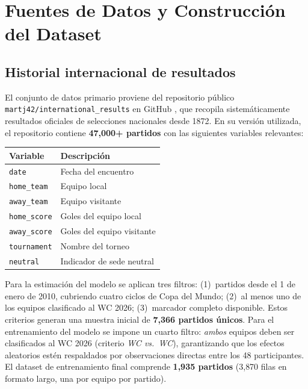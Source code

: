 \documentclass[12pt,a4paper]{article}
\begin{document}
\section{Fuentes de Datos y Construcción del Dataset}
\label{sec:data}

\subsection{Historial internacional de resultados}

El conjunto de datos primario proviene del repositorio público
\texttt{martj42/international\_results} en GitHub \citep{martj42},
que recopila sistemáticamente resultados oficiales de selecciones nacionales
desde 1872. En su versión utilizada, el repositorio contiene
\textbf{47{,}000+ partidos} con las siguientes variables relevantes:

\begin{center}
\begin{tabular}{ll}
\toprule
\textbf{Variable}   & \textbf{Descripción} \\
\midrule
\texttt{date}       & Fecha del encuentro \\
\texttt{home\_team} & Equipo local \\
\texttt{away\_team} & Equipo visitante \\
\texttt{home\_score}& Goles del equipo local \\
\texttt{away\_score}& Goles del equipo visitante \\
\texttt{tournament} & Nombre del torneo \\
\texttt{neutral}    & Indicador de sede neutral \\
\bottomrule
\end{tabular}
\end{center}

Para la estimación del modelo se aplican tres filtros: (1)~partidos desde
el 1 de enero de 2010, cubriendo cuatro ciclos de Copa del Mundo; (2)~al menos
uno de los equipos clasificado al WC 2026; (3)~marcador completo disponible.
Estos criterios generan una muestra inicial de \textbf{7{,}366 partidos únicos}.
Para el entrenamiento del modelo se impone un cuarto filtro: \textit{ambos}
equipos deben ser clasificados al WC 2026 (criterio \textit{WC vs.\ WC}),
garantizando que los efectos aleatorios estén respaldados por observaciones
directas entre los 48 participantes.
El dataset de entrenamiento final comprende \textbf{1{,}935 partidos}
(3{,}870 filas en formato largo, una por equipo por partido).
\end{document}
